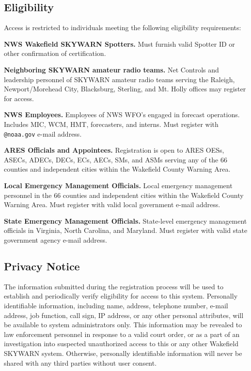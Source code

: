 \documentclass[pdflatex,letterpaper,twoside,12pt]{book}
\begin{document}
\subsection{Eligibility}

Access is restricted to individuals meeting the following eligibility requirements:

\textbf{NWS Wakefield SKYWARN Spotters.} Must furnish valid Spotter ID or other confirmation of certification.

\textbf{Neighboring SKYWARN amateur radio teams.} Net Controls and leadership personnel of SKYWARN amateur radio teams serving the Raleigh, Newport/Morehead City, Blacksburg, Sterling, and Mt. Holly offices may register for access.

\textbf{NWS Employees.} Employees of NWS WFO's engaged in forecast operations. Includes MIC, WCM, HMT, forecasters, and interns. Must register with \verb|@noaa.gov| e-mail address.

\textbf{ARES Officials and Appointees.} Registration is open to ARES OESs, ASECs, ADECs, DECs, ECs, AECs, SMs, and ASMs serving any of the 66 counties and independent cities within the Wakefield County Warning Area.

\textbf{Local Emergency Management Officials.} Local emergency management personnel in the 66 counties and independent cities within the Wakefield County Warning Area. Must register with valid local government e-mail address.

\textbf{State Emergency Management Officials.} State-level emergency management officials in Virginia, North Carolina, and Maryland. Must register with valid state government agency e-mail address.

\subsection{Privacy Notice}

The information submitted during the registration process will be used to establish and periodically verify eligibility for access to this system.  Personally identifiable information, including name, address, telephone number, e-mail address, job function, call sign, IP address, or any other personal attributes, will be available to system administrators only.  This information may be revealed to law enforcement personnel in response to a valid court order, or as a part of an investigation into suspected unauthorized access to this or any other Wakefield SKYWARN system.  Otherwise, personally identifiable information will never be shared with any third parties without user consent.
\end{document}
